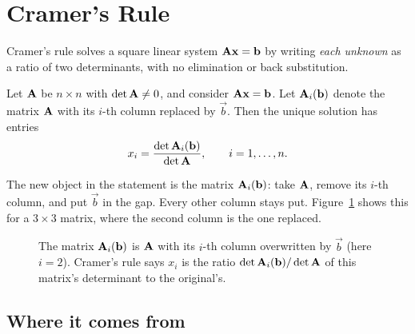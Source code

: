 \section{Cramer's Rule}

Cramer's rule solves a square linear system $\mathbf{A}\mathbf{x}=\mathbf{b}$ by writing \emph{each unknown} as
a ratio of two determinants, with no elimination or back substitution.

\begin{theorem}\label{ch22:thm-cramer}
Let $\mathbf{A}$ be $n\times n$ with $\det\mathbf{A}\neq 0$, and consider $\mathbf{A}\mathbf{x}=\mathbf{b}$. Let $\mathbf{A}_i(\mathbf{b})$ denote the matrix $\mathbf{A}$ with its $i$-th column replaced by $\vec b$. Then the unique
solution has entries
\[
x_i=\frac{\det \mathbf{A}_i(\mathbf{b})}{\det\mathbf{A}},\qquad i=1,\dots,n.
\]
\end{theorem}

The new object in the statement is the matrix $\mathbf{A}_i(\mathbf{b})$: take $\mathbf{A}$, remove its
$i$-th column, and put $\vec b$ in the gap. Every other column stays put. Figure~\ref{ch22:fig-replace}
shows this for a $3\times3$ matrix, where the second column is the one replaced.

\begin{figure}[H]
\centering
{}
\caption{The matrix $\mathbf{A}_i(\mathbf{b})$ is $\mathbf{A}$ with its $i$-th column overwritten by $\vec b$ (here
$i=2$). Cramer's rule says $x_i$ is the ratio $\det\mathbf{A}_i(\mathbf{b})/\det\mathbf{A}$ of this matrix's
determinant to the original's.}
\label{ch22:fig-replace}
\end{figure}

\subsection{Where it comes from}

